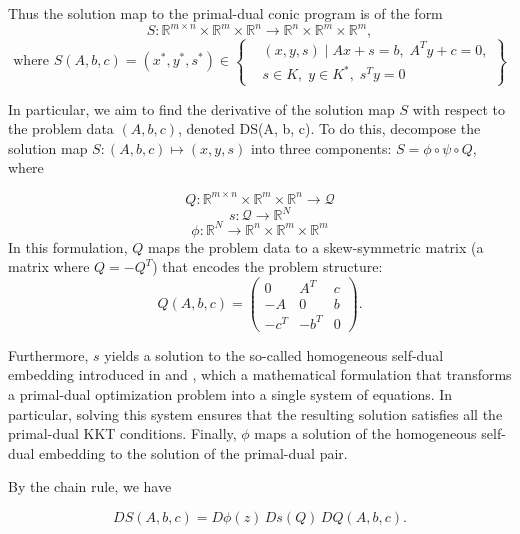 \documentclass{article}
\begin{document}
Thus the solution map to the primal-dual conic program is of the form 
\[
S: \mathbb{R}^{m \times n} \times \mathbb{R}^m \times \mathbb{R}^n \to \mathbb{R}^n \times \mathbb{R}^m \times \mathbb{R}^m,
\]
\[
\text{where } S(A, b, c) = (x^*, y^*, s^*) \in 
\left\{
\begin{aligned}
    & (x, y, s) \mid A x + s = b, \; A^T y + c = 0, \\
    & s \in K, \; y \in K^*, \; s^T y = 0
\end{aligned}
\right\}
\]

In particular, we aim to find the derivative of the solution map \(S\) with respect to the problem data \((A, b, c)\), denoted DS(A, b, c). To do this, decompose the solution map \(S: (A,b,c) \mapsto (x,y,s)\) into three components: \(S = \phi \circ \psi \circ Q\), where

\[
Q : \mathbb{R}^{m \times n} \times \mathbb{R}^m \times \mathbb{R}^n \to \mathcal{Q}
\]
\[
s : \mathcal{Q} \to \mathbb{R}^N
\]
\[
\phi : \mathbb{R}^N \to \mathbb{R}^n \times \mathbb{R}^m \times \mathbb{R}^m
\]In this formulation, $Q$ maps the problem data to a skew-symmetric matrix (a matrix where \(Q = -Q^T\)) that encodes the problem structure:
\begin{equation}
Q(A,b,c) = \begin{pmatrix} 
0 & A^T & c \\
-A & 0 & b \\
-c^T & -b^T & 0
\end{pmatrix}.
\end{equation}

Furthermore, $s$ yields a solution to the so-called homogeneous self-dual embedding introduced in \citet{Yeselfdualemb} and \citet{Xuselfdualemb}, which a mathematical formulation  that transforms a primal-dual optimization problem into a single system of equations. In particular, solving this system ensures that the resulting solution satisfies all the primal-dual KKT conditions. Finally, $\phi$ maps a solution of the homogeneous self-dual embedding to the solution of the primal-dual pair. 

By the chain rule, we have 

\[
DS(A, b, c) = D\phi(z) \, Ds(Q) \, DQ(A, b, c).
\]
\end{document}

